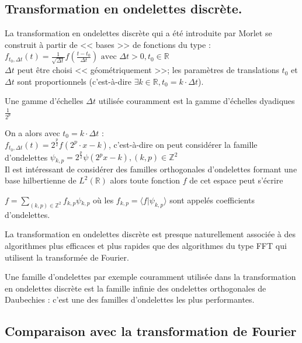 \documentclass{article}
\begin{document}
\subsection{Transformation en ondelettes discrète.}

La transformation en ondelettes discrète qui a été introduite par Morlet se construit à partir de << bases >> de fonctions du type : \\

$\displaystyle f_{t_{0},\Delta{}t}(t) = \frac{1}{\sqrt{\Delta{}t}}f\left(\frac{t-t_0}{\Delta{}t}\right) \text{ avec } \Delta{}t > 0, t_0 \in \mathbb{R}$ \\

$\Delta{}t$ peut être choisi << géométriquement >>; les paramètres de translations $t_0$ et $\Delta{}t$ sont proportionnels (c'est-à-dire $\exists k \in \mathbb{R}, t_0 = k\cdot{}\Delta{}t$).

Une gamme d'échelles $\Delta{}t$ utilisée couramment est la gamme d'échelles dyadiques $\frac{1}{2^p}$

On a alors avec $t_0 = k\cdot\Delta{}t$ : \\

$\displaystyle f_{t_{0},\Delta{}t}(t) = 2^{\frac{p}{2}}f(2^{p}\cdot{}x - k)$, c'est-à-dire on peut considérer la famille d'ondelettes $\psi{}_{k,p} = 2^{\frac{p}{2}}\psi{}(2^{p}x - k ), (k,p) \in \mathbb{Z}^2$ \\

Il est intéressant de considérer des familles orthogonales d'ondelettes formant une base hilbertienne de $L^2(\mathbb{R})$ alors toute fonction $f$ de cet espace peut s'écrire 

$\displaystyle f = \sum_{(k,p) \in \mathbb{Z}^2}f_{k,p}\psi{}_{k,p}$ où les $f_{k,p} = \langle{}f|\psi_{k,p}\rangle$ sont appelés coefficients d'ondelettes.

La transformation en ondelettes discrète est presque naturellement associée à des algorithmes plus efficaces et plus rapides que des algorithmes du type FFT qui utilisent la transformée de Fourier.

Une famille d’ondelettes par exemple couramment utilisée dans la transformation en ondelettes discrète est la famille infinie des ondelettes orthogonales de Daubechies : c’est une des familles d’ondelettes les plus performantes. \\




\subsection{Comparaison avec la transformation de Fourier}
\end{document}
